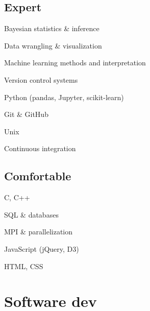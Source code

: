 \documentclass[letterpaper,12pt]{deedy-resume} %
\begin{document}
\begin{minipage}[t]{0.32\textwidth}
\subsection{Expert}
\begin{tighteritemize}
    \item Bayesian statistics \& inference
    \item Data wrangling \& visualization 
    \item Machine learning methods and interpretation
    \item Version control systems 
    \item Python {\footnotesize (pandas, Jupyter, scikit-learn)}
    \item Git \& GitHub
    \item Unix
    \item Continuous integration
\end{tighteritemize}

\sectionspace %

\subsection{Comfortable}
\begin{tighteritemize}
    \item C, C++
    \item SQL \& databases
    \item MPI \& parallelization
    \item JavaScript {\footnotesize (jQuery, D3)}
    \item HTML, CSS
\end{tighteritemize}

\sectionspace %



\section{Software dev}


\end{minipage}
\end{document}
